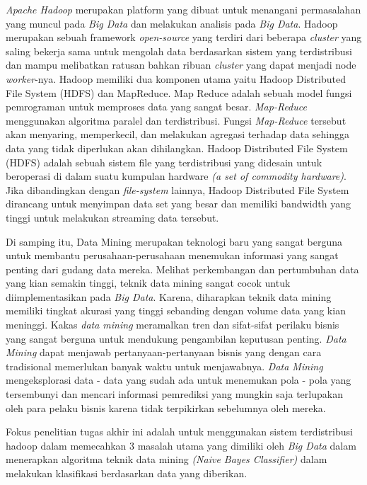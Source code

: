 \textit{Apache Hadoop} merupakan platform yang dibuat untuk menangani permasalahan yang muncul pada \textit{Big Data} dan melakukan analisis pada \textit{Big Data}. Hadoop merupakan sebuah framework \textit{open-source} yang terdiri dari beberapa \textit{cluster} yang saling bekerja sama untuk mengolah data berdasarkan sistem yang terdistribusi dan mampu melibatkan ratusan bahkan ribuan \textit{cluster} yang dapat menjadi node \textit{worker}-nya. Hadoop memiliki dua komponen utama yaitu Hadoop Distributed File System (HDFS) dan MapReduce. Map Reduce adalah sebuah model fungsi pemrograman untuk memproses data yang sangat besar.
\textit{Map-Reduce} menggunakan algoritma paralel dan terdistribusi. Fungsi \textit{Map-Reduce} tersebut akan menyaring, memperkecil, dan melakukan agregasi terhadap data sehingga data yang tidak diperlukan akan dihilangkan. Hadoop Distributed File System (HDFS) adalah sebuah sistem file yang terdistribusi yang didesain untuk beroperasi di dalam suatu kumpulan hardware \textit{(a set of commodity hardware)}. Jika dibandingkan dengan \textit{file-system} lainnya, Hadoop Distributed File System dirancang untuk menyimpan data set yang besar dan memiliki bandwidth yang tinggi untuk melakukan streaming data tersebut.


Di samping itu, Data Mining merupakan teknologi baru yang sangat berguna untuk membantu perusahaan-perusahaan menemukan informasi yang sangat penting dari gudang data mereka. Melihat perkembangan dan pertumbuhan data yang kian semakin tinggi, teknik data mining sangat cocok untuk diimplementasikan pada \textit{Big Data}. Karena, diharapkan teknik data mining memiliki tingkat akurasi yang tinggi sebanding dengan volume data yang kian meninggi. Kakas \textit{data mining} meramalkan tren dan sifat-sifat perilaku bisnis yang sangat berguna untuk mendukung pengambilan keputusan penting. \textit{Data Mining} dapat menjawab pertanyaan-pertanyaan bisnis yang dengan cara tradisional memerlukan banyak waktu untuk menjawabnya. \textit{Data Mining} mengeksplorasi data - data yang sudah ada untuk menemukan pola - pola yang tersembunyi dan mencari informasi pemrediksi yang mungkin saja terlupakan oleh para pelaku bisnis karena tidak terpikirkan sebelumnya oleh mereka.

Fokus penelitian tugas akhir ini adalah untuk menggunakan sistem terdistribusi hadoop dalam memecahkan 3 masalah utama yang dimiliki oleh \textit{Big Data} dalam menerapkan algoritma teknik data mining \textit{(Naive Bayes Classifier)} dalam melakukan klasifikasi berdasarkan data yang diberikan.

